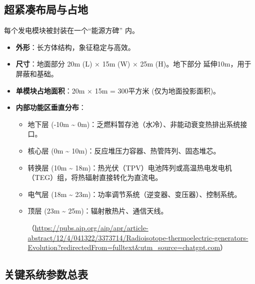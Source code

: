 \subsection{超紧凑布局与占地}\label{ux8d85ux7d27ux51d1ux5e03ux5c40ux4e0eux5360ux5730}

每个发电模块被封装在一个``能源方碑'' 内。

\begin{itemize}
\item
  \textbf{外形}：长方体结构，象征稳定与高效。
\item
  \textbf{尺寸}：地面部分 20m (L) × 15m (W) × 25m (H)。地下部分 延伸10m，用于屏蔽和基础。
\item
  \textbf{单模块占地面积}：20m × 15m = 300平方米 (仅为地面投影面积)。
\item
  \textbf{内部功能区垂直分布}：

  \begin{itemize}
  \item
    地下层 (-10m \textasciitilde{} 0m)：乏燃料暂存池（水冷）、非能动衰变热排出系统接口。
  \item
    核心层 (0m \textasciitilde{} 10m)：反应堆压力容器、热管阵列、固态堆芯。
  \item
    转换层 (10m \textasciitilde{} 18m)：热光伏（TPV）电池阵列或高温热电发电机（TEG）组，将热辐射直接转化为直流电。
  \item
    电气层 (18m \textasciitilde{} 23m)：功率调节系统（逆变器、变压器）、控制系统。
  \item
    顶层 (23m \textasciitilde{} 25m)：辐射散热片、通信天线。

（\url{https://pubs.aip.org/aip/apr/article-abstract/12/4/041322/3373714/Radioisotope-thermoelectric-generators-Evolution?redirectedFrom=fulltext\&utm\_source=chatgpt.com}）
  \end{itemize}
\end{itemize}

\subsection{关键系统参数总表}\label{ux5173ux952eux7cfbux7edfux53c2ux6570ux603bux8868}


